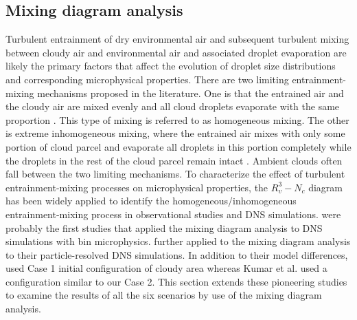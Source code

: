 \documentclass[draft,linenumbers]{AGUJournal}
\begin{document}
\subsection{Mixing diagram analysis}
Turbulent entrainment of dry environmental air and subsequent turbulent mixing between cloudy air and environmental air and associated droplet evaporation are likely the primary factors that affect the evolution of droplet size distributions and corresponding microphysical properties. There are two limiting entrainment-mixing mechanisms proposed in the literature. One is that the entrained air and the cloudy air are mixed evenly and all cloud droplets evaporate with the same proportion \citep{Warner1973}. This type of mixing is referred to as homogeneous mixing. The other is extreme inhomogeneous mixing, where the entrained air mixes with only some portion of cloud parcel and evaporate all droplets in this portion completely while the droplets in the rest of the cloud parcel remain intact \citep{Baker1980}. Ambient clouds often fall between the two limiting mechanisms. To characterize the effect of turbulent entrainment-mixing processes on microphysical properties, the $R_v^3-N_c$ diagram \citep{Burnet2007Observational} has been widely applied to identify the homogeneous/inhomogeneous entrainment-mixing process in observational studies and DNS simulations. \citet{And04, And06, And09} were probably the first studies that applied the mixing diagram analysis to DNS simulations with bin microphysics. \citet{Kumar14} further applied to the mixing diagram analysis to their particle-resolved DNS simulations. In addition to their model differences,  \citet{And04, And06, And09} used Case 1 initial configuration of cloudy area whereas Kumar et al. used a configuration similar to our Case 2. This section extends these pioneering studies to examine the results of all the six scenarios by use of the mixing diagram analysis.
\end{document}
